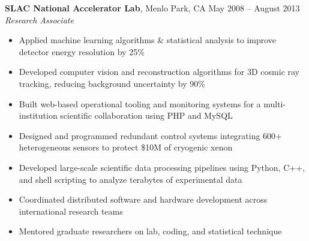 \documentclass[margin,line]{resume}
\begin{document}
\begin{resume}

    \textbf{SLAC National Accelerator Lab}, Menlo Park, CA \hfill May 2008 -- August 2013\vspace{1mm}\\\vspace{1mm}%
    \textsl{Research Associate}
    \begin{itemize}
    \item Applied machine learning algorithms \& statistical analysis to improve detector energy resolution by 25\%
    \item Developed computer vision and reconstruction algorithms for 3D cosmic ray tracking, reducing background uncertainty by 90\%
    \item Built web-based operational tooling and monitoring systems for a multi-institution scientific collaboration using PHP and MySQL
    \item Designed and programmed redundant control systems integrating 600+ heterogeneous sensors to protect \$10M of cryogenic xenon
    \item Developed large-scale scientific data processing pipelines using Python, C++, and shell scripting to analyze terabytes of experimental data
    \item Coordinated distributed software and hardware development across international research teams 
    \item Mentored graduate researchers on lab, coding, and statistical technique
    \end{itemize}



\end{resume}
\end{document}
